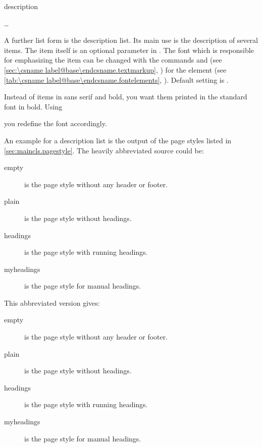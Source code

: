\begin{Declaration}
  \begin{Environment}{description}
    \begin{Body}
       \dots
      \BodyDots
    \end{Body}
  \end{Environment}
\end{Declaration}%
A further list form is the description list. Its main use is the description
of several items. The item itself is an optional parameter in
. The font%
 which is responsible for emphasizing the item can be changed with the commands
 and  (see \autoref{sec:\csname
  label@base\endcsname.textmarkup}, ) for the element
 (see
\autoref{tab:\csname label@base\endcsname.fontelements},
). Default
setting is \linebreak[2].%
\ifCommonmaincls
\begin{Example}
  \label{desc:maincls.env.description.example}%
  Instead of items in sans serif and bold, you want them printed in the
  standard font in bold. Using
\begin{lstcode}
\end{lstcode}
  you redefine the font accordingly.

  An example for a description list is the output of the page styles
  listed in \autoref{sec:maincls.pagestyle}. The heavily
  abbreviated source could be:
\begin{lstcode}
  \begin{description}
  \item[empty] is the page style without any header or footer.
    \item[plain] is the page style without headings.
    \item[headings] is the page style with running headings.
    \item[myheadings] is the page style for manual headings.
  \end{description}
\end{lstcode}
  This abbreviated version gives:
  \begin{ShowOutput}
    \begin{description}
    \item[empty] is the page style without any header or footer.
    \item[plain] is the page style without headings.
    \item[headings] is the page style with running headings.
    \item[myheadings] is the page style for manual headings.
    \end{description}
  \end{ShowOutput}
\end{Example}
\fi%
%
\EndIndexGroup
\fi %

